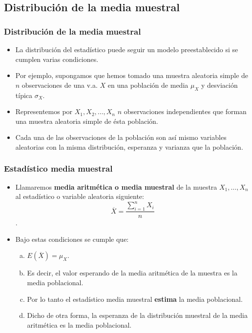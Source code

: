 \subsection{Distribución  de la media muestral}

\begin{frame} 
\frametitle{Distribución de la media muestral}
\begin{itemize}
\item La distribución del estadístico puede seguir un modelo preestablecido si se cumplen varias condiciones.
\item Por ejemplo, supongamos que hemos tomado una muestra aleatoria simple de $n$ observaciones
 de una v.a. $X$ en una población de media $\mu_{X}$ y desviación típica $\sigma_{X}$.
\item Representemos por $X_{1}, X_{2},\ldots,X_{n}$  
 $n$ observaciones independientes que forman
 una muestra aleatoria simple de ésta población.
\item  Cada una de las observaciones de la población son así mismo variables aleatorias con la misma distribución, esperanza y varianza  
que la población.
\end{itemize}
\end{frame}

\begin{frame}
\frametitle{Estadístico media muestral}
\begin{itemize}
\item Llamaremos \textbf{media aritmética o media muestral}  de la muestra
 $X_{1},\ldots,X_{n}$ al estadístico o variable aleatoria siguiente:
 $$\overline{X}=\frac{\sum_{i=1}^n X_{i}}{n}$$.
\item Bajo estas condiciones se cumple que:

\begin{enumerate}[a)]
\item $E(\overline{X})=\mu_{X}$.
\item  Es decir, el valor esperando de la media aritmética de la muestra es la media
 poblacional. 
\item Por lo tanto  el estadístico media muestral \textbf{estima} la media poblacional.
\item  Dicho  de  otra forma, la esperanza de la distribución muestral de la media aritmética es la media poblacional.
\end{enumerate}
\end{itemize}
\end{frame}

